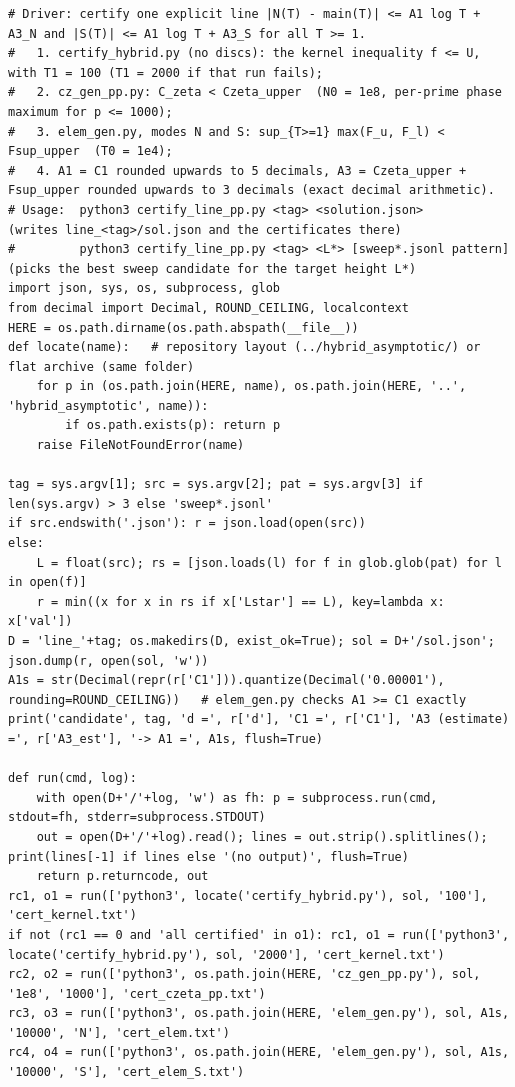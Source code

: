 \documentclass[11pt,reqno]{amsart}
\numberwithin{equation}{section}
\theoremstyle{definition}
\theoremstyle{remark}
\begin{document}
\begin{lstlisting}
# Driver: certify one explicit line |N(T) - main(T)| <= A1 log T + A3_N and |S(T)| <= A1 log T + A3_S for all T >= 1.
#   1. certify_hybrid.py (no discs): the kernel inequality f <= U, with T1 = 100 (T1 = 2000 if that run fails);
#   2. cz_gen_pp.py: C_zeta < Czeta_upper  (N0 = 1e8, per-prime phase maximum for p <= 1000);
#   3. elem_gen.py, modes N and S: sup_{T>=1} max(F_u, F_l) < Fsup_upper  (T0 = 1e4);
#   4. A1 = C1 rounded upwards to 5 decimals, A3 = Czeta_upper + Fsup_upper rounded upwards to 3 decimals (exact decimal arithmetic).
# Usage:  python3 certify_line_pp.py <tag> <solution.json>                  (writes line_<tag>/sol.json and the certificates there)
#         python3 certify_line_pp.py <tag> <L*> [sweep*.jsonl pattern]      (picks the best sweep candidate for the target height L*)
import json, sys, os, subprocess, glob
from decimal import Decimal, ROUND_CEILING, localcontext
HERE = os.path.dirname(os.path.abspath(__file__))
def locate(name):   # repository layout (../hybrid_asymptotic/) or flat archive (same folder)
    for p in (os.path.join(HERE, name), os.path.join(HERE, '..', 'hybrid_asymptotic', name)):
        if os.path.exists(p): return p
    raise FileNotFoundError(name)

tag = sys.argv[1]; src = sys.argv[2]; pat = sys.argv[3] if len(sys.argv) > 3 else 'sweep*.jsonl'
if src.endswith('.json'): r = json.load(open(src))
else:
    L = float(src); rs = [json.loads(l) for f in glob.glob(pat) for l in open(f)]
    r = min((x for x in rs if x['Lstar'] == L), key=lambda x: x['val'])
D = 'line_'+tag; os.makedirs(D, exist_ok=True); sol = D+'/sol.json'; json.dump(r, open(sol, 'w'))
A1s = str(Decimal(repr(r['C1'])).quantize(Decimal('0.00001'), rounding=ROUND_CEILING))   # elem_gen.py checks A1 >= C1 exactly
print('candidate', tag, 'd =', r['d'], 'C1 =', r['C1'], 'A3 (estimate) =', r['A3_est'], '-> A1 =', A1s, flush=True)

def run(cmd, log):
    with open(D+'/'+log, 'w') as fh: p = subprocess.run(cmd, stdout=fh, stderr=subprocess.STDOUT)
    out = open(D+'/'+log).read(); lines = out.strip().splitlines(); print(lines[-1] if lines else '(no output)', flush=True)
    return p.returncode, out
rc1, o1 = run(['python3', locate('certify_hybrid.py'), sol, '100'], 'cert_kernel.txt')
if not (rc1 == 0 and 'all certified' in o1): rc1, o1 = run(['python3', locate('certify_hybrid.py'), sol, '2000'], 'cert_kernel.txt')
rc2, o2 = run(['python3', os.path.join(HERE, 'cz_gen_pp.py'), sol, '1e8', '1000'], 'cert_czeta_pp.txt')
rc3, o3 = run(['python3', os.path.join(HERE, 'elem_gen.py'), sol, A1s, '10000', 'N'], 'cert_elem.txt')
rc4, o4 = run(['python3', os.path.join(HERE, 'elem_gen.py'), sol, A1s, '10000', 'S'], 'cert_elem_S.txt')


\end{lstlisting}
\end{document}
